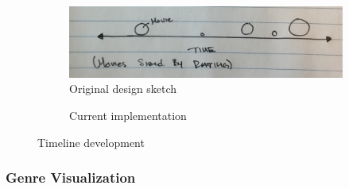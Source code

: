 \documentclass[12pt]{article}
\begin{document}
	\begin{figure}[h!]
			\centering
			\begin{subfigure}[t]{.5\textwidth}
			  \centering
			  \includegraphics[width=\linewidth]{images/timeline_crop.png}
			  \caption{Original design sketch}
			  \label{fig:sub1}
			\end{subfigure}%
			\begin{subfigure}[t]{.5\textwidth}
			  \centering
			  \caption{Current implementation}
			  \label{fig:sub2}
			\end{subfigure}%
			\caption{Timeline development}
			\label{fig:timeline}
		\end{figure}
		

\subsubsection{Genre Visualization}
\end{document}
